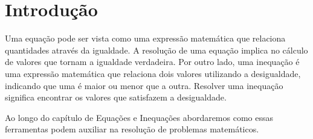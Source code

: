 \section{Introdução}

Uma equação pode ser vista como uma expressão matemática que relaciona quantidades através da igualdade. A resolução de uma equação implica no cálculo de valores que tornam a igualdade verdadeira. Por outro lado, uma inequação é uma expressão matemática que relaciona dois valores utilizando a desigualdade, indicando que uma é maior ou menor que a outra. Resolver uma inequação significa encontrar os valores que satisfazem a desigualdade. 

Ao longo do capítulo de Equações e Inequações abordaremos como essas ferramentas podem auxiliar na resolução de problemas matemáticos. 